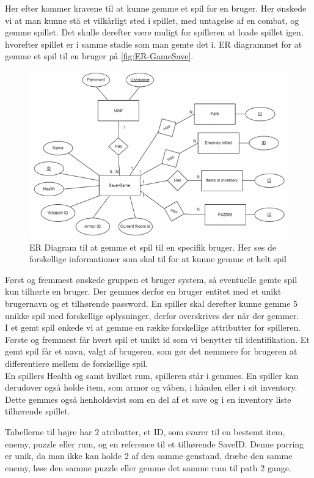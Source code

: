 \noindent Her efter kommer kravene til at kunne gemme et spil for en bruger. Her ønskede vi at man kunne stå et vilkårligt sted i spillet, med untagelse af en combat, og gemme spillet. Det skulle derefter være muligt for spilleren at loade spillet igen, hvorefter spillet er i samme stadie som man gemte det i.
ER diagrammet for at gemme et spil til en bruger på \autoref{fig:ER-GameSave}.
\begin{figure}[H]
\centering
\includegraphics[width = \textwidth]{02-Body/Images/ER-GameSave.PNG}
\caption{ER Diagram til at gemme et spil til en specifik bruger. Her ses de forskellige informationer som skal til for at kunne gemme et helt spil}
\label{fig:ER-GameSave}
\end{figure}

\noindent Først og fremmest ønskede gruppen et bruger system, så eventuelle gemte spil kun tilhørte en bruger.
Der gemmes derfor en bruger entitet med et unikt brugernavn og et tilhørende password.
En spiller skal derefter kunne gemme 5 unikke spil med forskellige oplysninger, derfor overskrives der når der gemmer.\\
I et gemt spil ønkede vi at gemme en række forskellige attributter for spilleren.
Første og fremmest får hvert spil et unikt id som vi benytter til identifikation.
Et gemt spil får et navn, valgt af brugeren, som gør det nemmere for brugeren at differentiere mellem de forskellige spil. \\ 
En spillers Health og samt hvilket rum, spilleren står i gemmes.
En spiller kan derudover også holde item, som armor og våben, i hånden eller i sit inventory. Dette gemmes også henholdsvist som en del af et save og i en inventory liste tilhørende spillet. 

\noindent Tabellerne til højre har 2 atributter, et ID, som svarer til en bestemt item, enemy, puzzle eller rum, og en reference til et tilhørende SaveID. 
Denne parring er unik, da man ikke kan holde 2 af den samme genstand, dræbe den samme enemy, løse den samme puzzle eller gemme det samme rum til path 2 gange.\\
